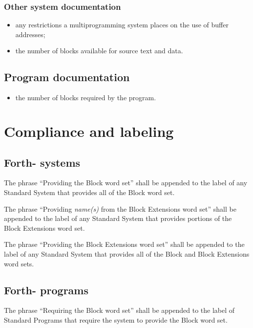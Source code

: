 \subsubsection{Other system documentation} %

\begin{itemize}
\item any restrictions a multiprogramming system places on the use
	of buffer addresses;
\item the number of blocks available for source text and data.
\end{itemize}

\subsection{Program documentation} %

\begin{itemize}
\item the number of blocks required by the program.
\end{itemize}


\section{Compliance and labeling} %

\subsection{Forth-\snapshot{} systems} %

The phrase ``Providing the Block word set'' shall be appended to
the label of any Standard System that provides all of the Block
word set.

The phrase ``Providing \emph{name(s)} from the Block Extensions
word set'' shall be appended to the label of any Standard System
that provides portions of the Block Extensions word set.

The phrase ``Providing the Block Extensions word set'' shall be
appended to the label of any Standard System that provides all of
the Block and Block Extensions word sets.

\subsection{Forth-\snapshot{} programs} %

The phrase ``Requiring the Block word set'' shall be appended to
the label of Standard Programs that require the system to provide
the Block word set.

